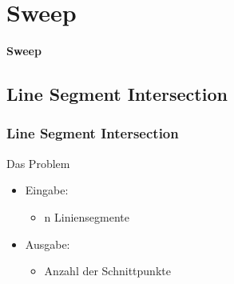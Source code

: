 \section{Sweep}
\begin{frame}
	\begin{center}
		\textbf{Sweep}
	\end{center}
\end{frame}

\subsection{Line Segment Intersection}
\begin{frame}
	\frametitle{{Line Segment Intersection}}
	\begin{block}{Das Problem}
	\begin{itemize}
		\pause
		\item{Eingabe:}
		\pause
		\begin{itemize}
			\item{n Liniensegmente}
		\end{itemize}
		\pause
		\item{Ausgabe:}
		\pause
		\begin{itemize}
			\item{Anzahl der Schnittpunkte}
		\end{itemize}
	\end{itemize}
	\end{block}
\end{frame}
